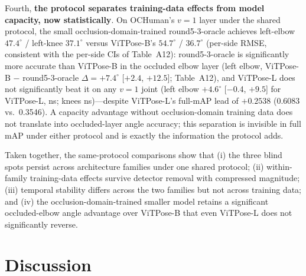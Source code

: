 \documentclass[10pt,conference]{IEEEtran}
\begin{document}
Fourth, \textbf{the protocol separates training-data effects from model capacity, now statistically}. On OCHuman's $v{=}1$ layer under the shared protocol, the small occlusion-domain-trained round5-3-oracle achieves left-elbow $47.4^{\circ}$ / left-knee $37.1^{\circ}$ versus ViTPose-B's $54.7^{\circ}$ / $36.7^{\circ}$ (per-side RMSE, consistent with the per-side CIs of Table~A12): round5-3-oracle is significantly more accurate than ViTPose-B in the occluded elbow layer (left elbow, ViTPose-B $-$ round5-3-oracle $\Delta=+7.4^{\circ}$ [$+2.4$, $+12.5$]; Table~A12), and ViTPose-L does not significantly beat it on any $v{=}1$ joint (left elbow $+4.6^{\circ}$ [$-$0.4, $+9.5$] for ViTPose-L, ns; knees ns)---despite ViTPose-L's full-mAP lead of $+0.2538$ (0.6083 vs.\ 0.3546). A capacity advantage without occlusion-domain training data does not translate into occluded-layer angle accuracy; this separation is invisible in full mAP under either protocol and is exactly the information the protocol adds.

Taken together, the same-protocol comparisons show that (i) the three blind spots persist across architecture families under one shared protocol; (ii) within-family training-data effects survive detector removal with compressed magnitude; (iii) temporal stability differs across the two families but not across training data; and (iv) the occlusion-domain-trained smaller model retains a significant occluded-elbow angle advantage over ViTPose-B that even ViTPose-L does not significantly reverse.

\section{Discussion}
\end{document}
